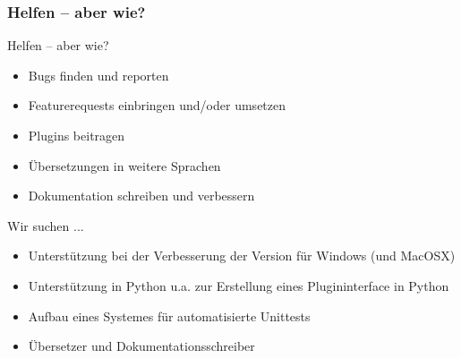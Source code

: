 \begin{frame}
	\frametitle{Helfen -- aber wie?}
	\begin{block}{Helfen -- aber wie?}
		\begin{itemize}
			\item Bugs finden und reporten
			\item Featurerequests einbringen und/oder umsetzen
			\item Plugins beitragen
			\item Übersetzungen in weitere Sprachen
			\item Dokumentation schreiben und verbessern
		\end{itemize}
	\end{block}
	\pause
	\begin{block}{Wir suchen ... }
		\begin{itemize}
			\item Unterstützung bei der Verbesserung der Version für
				  Windows (und MacOSX)
			\item Unterstützung in Python u.a. zur Erstellung eines
				  Plugininterface in Python
			\item Aufbau eines Systemes für automatisierte Unittests
			\item Übersetzer und Dokumentationsschreiber
		\end{itemize}
	\end{block}
\end{frame}
